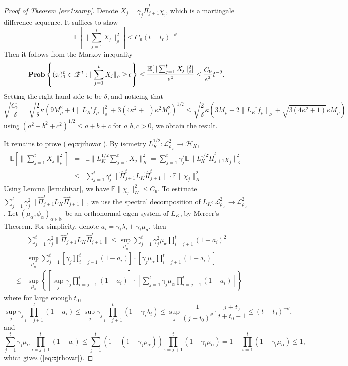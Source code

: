 \documentclass[twoside,11pt]{amsart}
\theoremstyle{theorem}
\theoremstyle{definition}
\theoremstyle{remark}
\def\Z{{\mathbb Z}}        %
\def\E{{\mathbb E}}        %
\def\L{{\mathscr L}}
\def\L2{{\mathscr L}^2_{\rho_\X}}
\def\M{M_\rho}
\def\H{{\mathscr H}}
\def\X{{\mathscr X}}
\def\Z{{\mathscr Z}}
\def\PPi{{\hat{\Pi}}}
\def\N{{\mathbb N}}
\def\Prob{{\bf Prob}}
\def\t{t_0}
\def\al{\alpha}
\def\la{\lambda}
\def\ka{\kappa}
\def\ga{\gamma}
\def\eps{\epsilon}
\begin{document}
\begin{proof}[Proof of Theorem \ref{err1:samp}] Denote $X_j = \gamma_j \PPi_{j+1}^t \chi_j$, which is a martingale difference sequence. 
It suffices to show
\begin{equation} \label{eq:xjrhovar}
\E[ \|\sum_{j=1}^t X_j\|_\rho^2] \leq C_{9} (t+\t)^{-\theta}. 
\end{equation}
Then it follows from the Markov inequality 
\[ \Prob \left\{(z_i)_1^t\in \Z^t: \|\sum_{j=1}^t X_j\|_\rho\geq \eps \right\}\leq \frac{\E[ \|\sum_{j=1}^t X_j\|_\rho^2]}{\eps^2} \leq 
\frac{C_{9}}{\eps^2 }t^{-\theta}. \] 
Setting the right hand side to be $\delta$, and noticing that
$$\sqrt{\frac{C_{9}}{\delta}}= \sqrt{\frac{2}{\delta}} \ka  (9 \M^2 + 4\|L_K^{-r} f_\rho \|_\rho^2 + 3 (4\ka^2+1) \ka^2 \M^2 )^{1/2} \leq  
\sqrt{\frac{2}{\delta}} \ka (3 \M + 2\|L_K^{-r} f_\rho \|_\rho + \sqrt{3 (4\ka^2+1)} \ka \M )$$
using $(a^2+b^2+c^2)^{1/2} \leq a + b + c$ for $a,b,c>0$, we obtain the result. 

It remains to prove (\ref{eq:xjrhovar}). By isometry $L_K^{1/2}:\L2\to \H_K$, 
\begin{eqnarray*} 
\E[ \|\sum_{j=1}^t X_j\|_\rho^2 ]& = & \E \| L_K^{1/2} \sum_{j=1}^t X_j\|_K^2  = 
\sum_{j=1}^t \gamma_j^2 \E \| L_K^{1/2}  \PPi_{j+1}^t \chi_j\|_K^2 \\
& \leq & \sum_{j=1}^t \gamma_j^2 \| \PPi_{j+1}^t L_K \PPi_{j+1}^t\|\cdot \E\| \chi_j\|_K^2 
\end{eqnarray*}
Using Lemma \ref{lem:chivar}, we have $\E\|\chi_j\|_K^2 \leq  C_{9}$. 
To estimate $\sum_{j=1}^t \gamma_j^2 \| \PPi_{j+1}^t L_K \PPi_{j+1}^t\|$, we use the spectral decomposition of $L_K:\L2\to \L2$. 
Let $(\mu_\al, \phi_\al)_{\al\in \N}$ be an orthonormal eigen-system of $L_K$, by Mercer's Theorem. For simplicity, denote $a_i = \ga_i \la_i + \ga_i \mu_\al$, then
\begin{eqnarray*}
&& \sum_{j=1}^t \gamma_j^2 \| \PPi_{j+1}^t L_K \PPi_{j+1}^t\| \leq \sup_{\mu_\al} \sum_{j=1}^t \ga_j^2 \mu_\al \prod_{i=j+1}^t (1-a_i)^2 \\
& = & \sup_{\mu_\al} \sum_{j=1}^t \left [\ga_j  \prod_{i=j+1}^t (1-a_i) \right]  \cdot \left[\ga_j \mu_\al \prod_{i=j+1}^t (1-a_i)\right] \\
& \leq & \sup_{\mu_\al} \left\{\left [ \sup_{j}\ga_j  \prod_{i=j+1}^t (1-a_i) \right] \cdot
\left[ \sum_{j=1}^t \ga_j \mu_\al \prod_{i=j+1}^t (1-a_i)\right] \right\}
\end{eqnarray*}
where for large enough $\t$, 
\begin{equation}  \label{eq:sup}
\sup_j \ga_j  \prod_{i=j+1}^t (1-a_i)\leq  \sup_j \ga_j  \prod_{i=j+1}^t (1- \ga_i \la_i) \leq \sup_j \frac{1}{(j+\t)^\theta}\cdot \frac{j+\t}{t+\t+1} 
\leq (t+\t)^{-\theta},
\end{equation}
and 
\[ \sum_{j=1}^t \ga_j \mu_\al \prod_{i=j+1}^t (1-a_i) \leq  \sum_{j=1}^t (1 - (1-\ga_j \mu_\al))\prod_{i=j+1}^t (1-\ga_i \mu_\al ) =
1 - \prod_{i=1}^t(1-\ga_i \mu_\al ) \leq 1,\]
which gives (\ref{eq:xjrhovar}).
\end{proof}
\end{document}
